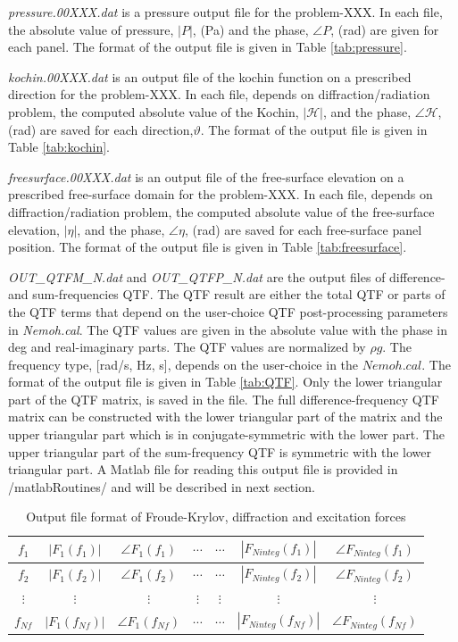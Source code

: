 \documentclass[12pt,a4paper,titlepage]{article}
\begin{document}
\textit{pressure.00XXX.dat} is a pressure output file for the problem-XXX.  In each file, the absolute value of pressure, $|P|$, (Pa) and the phase, $\angle P$, (rad) are given for each panel. The format of the output file is given in Table \ref{tab:pressure}.

\textit{kochin.00XXX.dat} is an output file of the kochin function on a prescribed direction for the problem-XXX. In each file, depends on diffraction/radiation problem, the computed absolute value of the Kochin, $|\mathcal{H}|$, and the phase, $\angle \mathcal{H}$, (rad) are saved for each direction,$\vartheta$. The format of the output file is given in Table \ref{tab:kochin}.

\textit{freesurface.00XXX.dat} is an output file of the free-surface elevation on a prescribed free-surface domain for the problem-XXX. In each file, depends on diffraction/radiation problem, the computed absolute value of the free-surface elevation, $|\eta|$, and the phase, $\angle \eta$, (rad) are saved for each free-surface panel position. The format of the output file is given in Table \ref{tab:freesurface}.

\textit{OUT\_QTFM\_N.dat} and \textit{OUT\_QTFP\_N.dat} are the output files of difference- and sum-frequencies QTF. The  QTF result are either the total QTF or parts of the QTF terms that depend on the user-choice QTF post-processing parameters in \textit{Nemoh.cal}. The QTF values are given in the absolute value with the phase in deg and real-imaginary parts. The QTF values are normalized by $\rho g$. The frequency type, [rad/s, Hz, s], depends on the user-choice in the $Nemoh.cal$. The format of the output file is given in Table \ref{tab:QTF}. Only the lower triangular part of the QTF matrix, is saved in the file. The full difference-frequency QTF matrix can be constructed with the lower triangular part of the matrix and the upper triangular part which is in conjugate-symmetric with the lower part. The upper triangular part of the sum-frequency QTF is symmetric with the lower triangular part.  A Matlab file for reading this output file is provided in /matlabRoutines/ and will be described in next section.

\begin{table}[ht]
\begin{center}
\caption{Output file format of Froude-Krylov, diffraction and excitation forces}\label{tab:WaveForce}
\begin{tabular}{ccccccc}
\hline
$f_1$ & $|F_1(f_1)|$ & $\angle F_1(f_1)$ &$\cdots$ &$\cdots$&$|F_{Ninteg}(f_1)|$ & $\angle F_{Ninteg}(f_1)$ \\
\hline
$f_2$ &  $|F_1(f_2)|$ & $\angle F_1(f_2)$ &$\cdots$ &$\cdots$&$|F_{Ninteg}(f_2)|$ & $\angle F_{Ninteg}(f_2)$ \\
\hline
$\vdots$ & $\vdots$ & $\vdots$ & $\vdots$ & $\vdots$ & $\vdots$ & $\vdots$ \\
\hline
$f_{Nf}$ &  $|F_1(f_{Nf})|$ & $\angle F_1(f_{Nf})$ &$\cdots$ &$\cdots$&$|F_{Ninteg}(f_{Nf})|$ & $\angle F_{Ninteg}(f_{Nf})$ \\
\hline
\end{tabular}
\end{center}
\end{table}
\end{document}
